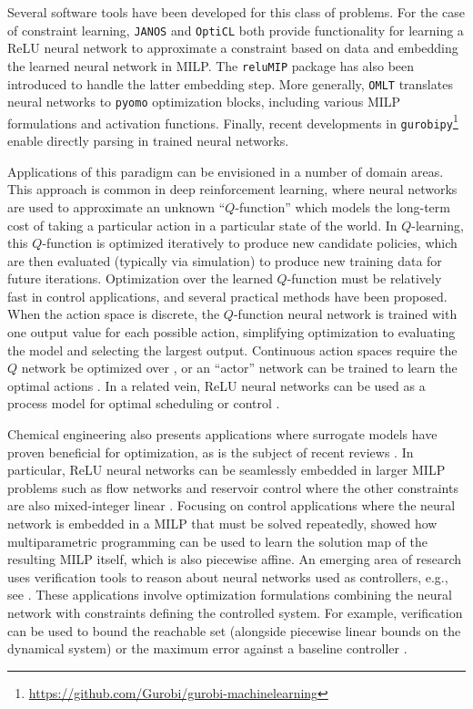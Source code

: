 Several software tools have been developed for this class of problems. For the case of constraint learning, \texttt{JANOS} \citep{bergman2022janos} and \texttt{OptiCL} \citep{maragno2021mixed} both provide functionality for learning a ReLU neural network to approximate a constraint based on data and embedding the learned neural network in MILP. 
The \texttt{reluMIP} package \citep{reluMIP} has also been introduced to handle the latter embedding step. 
More generally, \texttt{OMLT} \citep{ceccon2022omlt} translates neural networks to \texttt{pyomo} optimization blocks, including various MILP formulations and activation functions. 
Finally, recent developments in \texttt{gurobipy}\footnote{\url{https://github.com/Gurobi/gurobi-machinelearning}} enable directly parsing in trained neural networks.


Applications of this paradigm can be envisioned in a number of domain areas. This approach is common in deep reinforcement learning, where neural networks are used to approximate an unknown ``$Q$-function'' which models the long-term cost of taking a particular action in a particular state of the world. In $Q$-learning, this $Q$-function is optimized iteratively to produce new candidate policies, which are then evaluated (typically via simulation) to produce new training data for future iterations. 
Optimization over the learned $Q$-function must be relatively fast in control applications, and several practical methods have been proposed. 
When the action space is discrete, the $Q$-function neural network is trained with one output value for each possible action, simplifying optimization to evaluating the model and selecting the largest output. 
Continuous action spaces require the $Q$ network be optimized over \citep{burtea2023safe,delarue2020reinforcement,ryu2020caql}, or an ``actor'' network can be trained to learn the optimal actions \citep{lillicrap2015continuous}. 
In a related vein, ReLU neural networks can be used as a process model for optimal scheduling or control \citep{wu2020scalable}.

Chemical engineering also presents applications where surrogate models have proven beneficial for optimization, as  is the subject of recent reviews \citep{bhosekar2018advances,mcbride2019overview,tsay2019110th}.  
In particular, ReLU neural networks can be seamlessly embedded in larger MILP problems such as flow networks and reservoir control where the other constraints are also mixed-integer linear \citep{grimstad2019surrogate,Planning,yang2022modeling}. 
Focusing on control applications where the neural network is embedded in a MILP that must be solved repeatedly, \cite{katz2020integrating} showed how multiparametric programming can be used to learn the solution map of the resulting MILP itself, which is also piecewise affine. 
An emerging area of research uses verification tools to reason about neural networks used as controllers, e.g., see \citet{ARCH_COMP_20}. These applications involve optimization formulations combining the neural network with constraints defining the controlled system. 
For example, verification can be used to bound the reachable set \citep{sidrane2022overt} (alongside piecewise linear bounds on the dynamical system) or the maximum error against a baseline controller \citep{schwan2022stability}.


